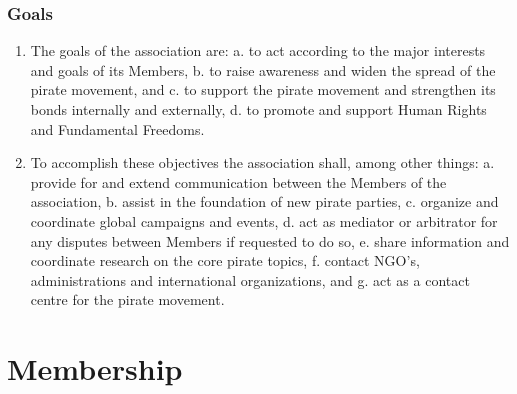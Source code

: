 \begin{frame}

\frametitle{Goals}
\label{goals}

\begin{enumerate}
\item The goals of the association are:
 a. to act according to the major interests and goals of its Members,
 b. to raise awareness and widen the spread of the pirate movement, and
 c. to support the pirate movement and strengthen its bonds internally and externally,
 d. to promote and support Human Rights and Fundamental Freedoms.

\item To accomplish these objectives the association shall, among other things:
 a. provide for and extend communication between the Members of the association,
 b. assist in the foundation of new pirate parties,
 c. organize and coordinate global campaigns and events,
 d. act as mediator or arbitrator for any disputes between Members if requested to do so,
 e. share information and coordinate research on the core pirate topics,
 f. contact NGO's, administrations and international organizations, and
 g. act as a contact centre for the pirate movement.

\end{enumerate}

\end{frame}

\section{Membership}
\label{membership}

